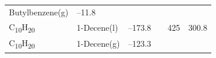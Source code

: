 \documentclass[
  9pt,
]{extbook}
\theoremstyle{definition}
\theoremstyle{definition}
\theoremstyle{definition}
\theoremstyle{remark}
\begin{document}
\begin{longtable}[]{@{}llllll@{}}
\begin{minipage}[t]{0.17\columnwidth}
Butylbenzene(g)\strut
\end{minipage} & \begin{minipage}[t]{0.15\columnwidth}\raggedright
--11.8\strut
\end{minipage} & \begin{minipage}[t]{0.15\columnwidth}\raggedright
\strut
\end{minipage} & \begin{minipage}[t]{0.14\columnwidth}\raggedright
\strut
\end{minipage} & \begin{minipage}[t]{0.14\columnwidth}\raggedright
\strut
\end{minipage}\tabularnewline
\begin{minipage}[t]{0.07\columnwidth}\raggedright
C\textsubscript{10}H\textsubscript{20}\strut
\end{minipage} & \begin{minipage}[t]{0.17\columnwidth}\raggedright
1-Decene(l)\strut
\end{minipage} & \begin{minipage}[t]{0.15\columnwidth}\raggedright
--173.8\strut
\end{minipage} & \begin{minipage}[t]{0.15\columnwidth}\raggedright
\strut
\end{minipage} & \begin{minipage}[t]{0.14\columnwidth}\raggedright
425\strut
\end{minipage} & \begin{minipage}[t]{0.14\columnwidth}\raggedright
300.8\strut
\end{minipage}\tabularnewline
\begin{minipage}[t]{0.07\columnwidth}\raggedright
C\textsubscript{10}H\textsubscript{20}\strut
\end{minipage} & \begin{minipage}[t]{0.17\columnwidth}\raggedright
1-Decene(g)\strut
\end{minipage} & \begin{minipage}[t]{0.15\columnwidth}\raggedright
--123.3\strut
\end{minipage} & \begin{minipage}[t]{0.15\columnwidth}\raggedright
\strut
\end{minipage} & \begin{minipage}[t]{0.14\columnwidth}\raggedright
\strut
\end{minipage} & \begin{minipage}[t]{0.14\columnwidth}\raggedright

\end{minipage}
\end{longtable}
\end{document}
